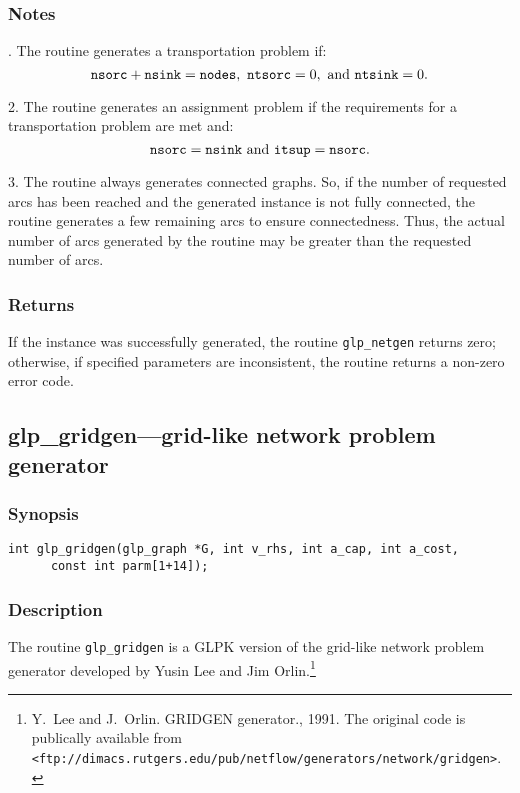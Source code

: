 \documentclass[dvipdfm,11pt]{report}
\begin{document}
\subsubsection*{Notes}

\noindent{}. The routine generates a transportation problem if:
$${\tt nsorc}+{\tt nsink}={\tt nodes},
\  {\tt ntsorc}=0,\ \mbox{and}\ {\tt ntsink}=0.$$

2. The routine generates an assignment problem if the requirements for
a transportation problem are met and:
$${\tt nsorc}={\tt nsink}\ \mbox{and}\ {\tt itsup}={\tt nsorc}.$$

3. The routine always generates connected graphs. So, if the number of
requested arcs has been reached and the generated instance is not fully
connected, the routine generates a few remaining arcs to ensure
connectedness. Thus, the actual number of arcs generated by the routine
may be greater than the requested number of arcs.

\subsubsection*{Returns}

If the instance was successfully generated, the routine
\verb|glp_netgen| returns zero; otherwise, if specified parameters are
inconsistent, the routine returns a non-zero error code.

\subsection{glp\_gridgen---grid-like network problem generator}

\subsubsection*{Synopsis}

\begin{verbatim}
int glp_gridgen(glp_graph *G, int v_rhs, int a_cap, int a_cost,
      const int parm[1+14]);
\end{verbatim}

\subsubsection*{Description}

The routine \verb|glp_gridgen| is a GLPK version of the grid-like
network problem generator developed by Yusin Lee and Jim
Orlin.\footnote{Y.~Lee and J.~Orlin. GRIDGEN generator., 1991. The
original code is publically available from
{\tt<ftp://dimacs.rutgers.edu/pub/netflow/generators/network/gridgen>}.}
\end{document}
